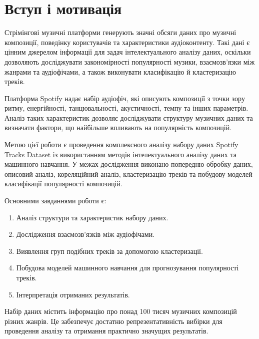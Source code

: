 \section{Вступ і мотивація}

Стрімінгові музичні платформи генерують значні обсяги даних про музичні композиції, поведінку користувачів та характеристики аудіоконтенту. Такі дані є цінним джерелом інформації для задач інтелектуального аналізу даних, оскільки дозволяють досліджувати закономірності популярності музики, взаємозв'язки між жанрами та аудіофічами, а також виконувати класифікацію й кластеризацію треків.

Платформа Spotify надає набір аудіофіч, які описують композиції з точки зору ритму, енергійності, танцювальності, акустичності, темпу та інших параметрів. Аналіз таких характеристик дозволяє досліджувати структуру музичних даних та визначати фактори, що найбільше впливають на популярність композицій.

Метою цієї роботи є проведення комплексного аналізу набору даних Spotify Tracks Dataset із використанням методів інтелектуального аналізу даних та машинного навчання. У межах дослідження виконано попередню обробку даних, описовий аналіз, кореляційний аналіз, кластеризацію треків та побудову моделей класифікації популярності композицій.

Основними завданнями роботи є:
\begin{enumerate}
  \item Аналіз структури та характеристик набору даних.
  \item Дослідження взаємозв'язків між аудіофічами.
  \item Виявлення груп подібних треків за допомогою кластеризації.
  \item Побудова моделей машинного навчання для прогнозування популярності треків.
  \item Інтерпретація отриманих результатів.
\end{enumerate}

Набір даних містить інформацію про понад 100 тисяч музичних композицій різних жанрів. Це забезпечує достатню репрезентативність вибірки для проведення аналізу та отримання практично значущих результатів.
